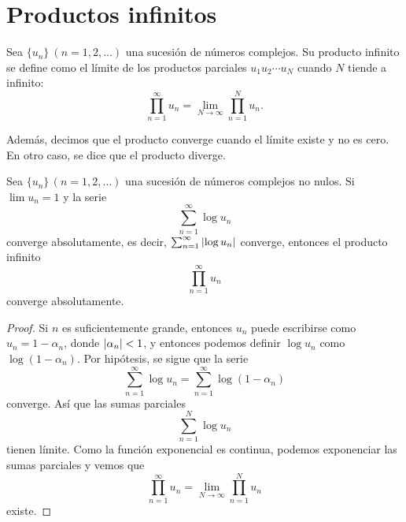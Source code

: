 \chapter{Productos infinitos}

\begin{definition}
    Sea $\{u_n\} \ (n=1,2, \dots)$ una sucesión de números complejos. Su producto infinito se define como el límite de los productos parciales $u_1 u_2 \cdots u_N$ cuando $N$ tiende a infinito:
\begin{equation*}
    \prod_{n=1}^{\infty} u_n = \lim_{N \rightarrow \infty} \prod_{n=1}^{N} u_n.
\end{equation*}


Además, decimos que el producto converge cuando el límite existe y no es cero. En otro caso, se dice que el producto diverge.
\end{definition}

\bigskip


\begin{prop}
    Sea $\{u_n\} \, (n=1,2, \dots)$ una sucesión de números complejos no nulos. Si $\lim u_n =1$ y la serie
    \begin{equation*}
        \sum_{n=1}^{\infty} \log u_n
    \end{equation*}
    converge absolutamente, es decir, $ \sum_{n=1}^{\infty} \left\lvert\log u_n\right\rvert$ converge, entonces el producto infinito
    \begin{equation*}
        \prod_{n=1}^{\infty} u_n
    \end{equation*}
    converge absolutamente.
\end{prop}

\begin{proof}
    Si $n$ es suficientemente grande, entonces $u_n$ puede escribirse como $u_n = 1 - \alpha_n$, donde $\left\lvert\alpha_n\right\rvert < 1$, y entonces podemos definir $\log{u_n}$ como $\log{(1 - \alpha_n)}$. Por hipótesis, se sigue que la serie
    \begin{equation*}
        \sum_{n=1}^{\infty} \log u_n = \sum_{n=1}^{\infty} \log{(1 - \alpha_n)}
    \end{equation*}
    converge. Así que las sumas parciales
    \begin{equation*}
        \sum_{n=1}^{N} \log u_n
    \end{equation*}
    tienen límite. Como la función exponencial es continua, podemos exponenciar las sumas parciales y vemos que
    \begin{equation*}
        \prod_{n=1}^{\infty} u_n = \lim_{N \rightarrow \infty} \prod_{n=1}^{N} u_n
    \end{equation*}
    existe.
\end{proof}

